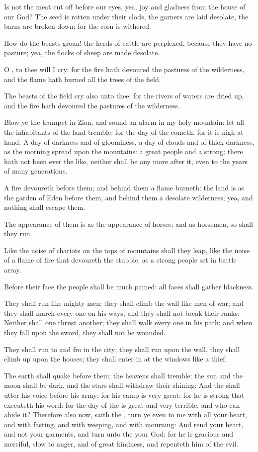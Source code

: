 \Verse Is not the meat cut off before our eyes, yea, joy and gladness from the house of our God?  \Verse The seed is rotten under their clods, the garners are laid desolate, the barns are broken down; for the corn is withered.

\Verse How do the beasts groan! the herds of cattle are perplexed, because they have no pasture; yea, the flocks of sheep are made desolate.

\Verse O \LORD, to thee will I cry: for the fire hath devoured the pastures of the wilderness, and the flame hath burned all the trees of the field.

\Verse The beasts of the field cry also unto thee: for the rivers of waters are dried up, and the fire hath devoured the pastures of the wilderness.


\Chapter
\Verse Blow ye the trumpet in Zion, and sound an alarm in my holy mountain: let all the inhabitants of the land tremble: for the day of the \LORD cometh, for it is nigh at hand; \Verse A day of darkness and of gloominess, a day of clouds and of thick darkness, as the morning spread upon the mountains: a great people and a strong; there hath not been ever the like, neither shall be any more after it, even to the years of many generations.

\Verse A fire devoureth before them; and behind them a flame burneth: the land is as the garden of Eden before them, and behind them a desolate wilderness; yea, and nothing shall escape them.

\Verse The appearance of them is as the appearance of horses; and as horsemen, so shall they run.

\Verse Like the noise of chariots on the tops of mountains shall they leap, like the noise of a flame of fire that devoureth the stubble, as a strong people set in battle array.

\Verse Before their face the people shall be much pained: all faces shall gather blackness.

\Verse They shall run like mighty men; they shall climb the wall like men of war; and they shall march every one on his ways, and they shall not break their ranks: \Verse Neither shall one thrust another; they shall walk every one in his path: and when they fall upon the sword, they shall not be wounded.

\Verse They shall run to and fro in the city; they shall run upon the wall, they shall climb up upon the houses; they shall enter in at the windows like a thief.

\Verse The earth shall quake before them; the heavens shall tremble: the sun and the moon shall be dark, and the stars shall withdraw their shining: \Verse And the \LORD shall utter his voice before his army: for his camp is very great: for he is strong that executeth his word: for the day of the \LORD is great and very terrible; and who can abide it?  \Verse Therefore also now, saith the \LORD, turn ye even to me with all your heart, and with fasting, and with weeping, and with mourning: \Verse And rend your heart, and not your garments, and turn unto the \LORD your God: for he is gracious and merciful, slow to anger, and of great kindness, and repenteth him of the evil.


